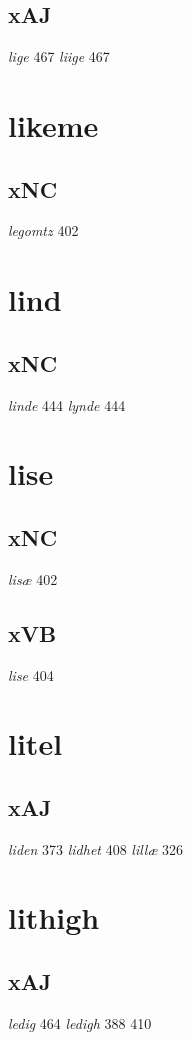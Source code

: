 \documentclass[a4paper,twocolumn]{article}
\begin{document}
\subsection{xAJ}
\label{sec:org9532e6a}
\emph{lige} 467 \emph{liige} 467 
\section{likeme}
\label{sec:orgfb14873}
\subsection{xNC}
\label{sec:org4839e15}
\emph{legomtz} 402 
\section{lind}
\label{sec:org3f3018d}
\subsection{xNC}
\label{sec:org7b8eb6a}
\emph{linde} 444 \emph{lynde} 444 
\section{lise}
\label{sec:org3526c62}
\subsection{xNC}
\label{sec:orgccd9453}
\emph{lisæ} 402 
\subsection{xVB}
\label{sec:orgb236d09}
\emph{lise} 404 
\section{litel}
\label{sec:org908a7de}
\subsection{xAJ}
\label{sec:org0e5778b}
\emph{liden} 373 \emph{lidhet} 408 \emph{lillæ} 326 
\section{lithigh}
\label{sec:orgb70126d}
\subsection{xAJ}
\label{sec:org51d7714}
\emph{ledig} 464 \emph{ledigh} 388 410 
\end{document}
